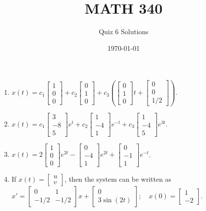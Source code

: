 \documentclass{article}
\begin{document}
\title{MATH 340}
\author{Quiz 6 Solutions}
\date{\today}
\maketitle

\begin{enumerate}
\item $x(t)=c_1\begin{bmatrix}1 \\ 0 \\ 0\end{bmatrix} + c_2\begin{bmatrix}0 \\ 1 \\ 0\end{bmatrix} + c_3\left(\begin{bmatrix}0 \\ 1 \\ 0\end{bmatrix}t + \begin{bmatrix}0 \\ 0 \\ 1/2\end{bmatrix}\right)$.
\item $x(t)=c_1\begin{bmatrix}3 \\ -8 \\ 5\end{bmatrix}e^t +c_2\begin{bmatrix}1 \\ -4 \\ 1\end{bmatrix}e^{-t} + c_3\begin{bmatrix}1 \\ -4 \\ 5\end{bmatrix}e^{3t}$.
\item $x(t)=2\begin{bmatrix}1 \\ 0 \\ 0\end{bmatrix}e^{2t} -\begin{bmatrix}0 \\ -4 \\ 1\end{bmatrix}e^{2t} + \begin{bmatrix}0 \\ -1 \\ 1\end{bmatrix}e^{-t}$.
\item If $x(t)=\begin{bmatrix}u\\v\end{bmatrix}$, then the system can be written as\\
$x'=\begin{bmatrix}0 & 1\\ -1/2 & -1/2\end{bmatrix}x + \begin{bmatrix}0\\3\sin(2t)\end{bmatrix}; \quad x(0)=\begin{bmatrix}1\\-2\end{bmatrix}$.
\end{enumerate}
\end{document}
